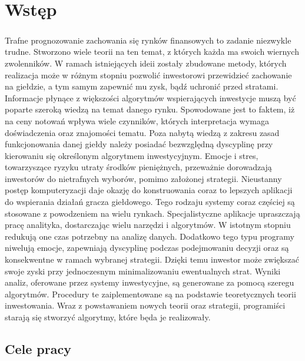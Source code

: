 \documentclass[pdflatex,11pt]{aghdpl}
\author{Tomasz Górny}
\date{2012}
\begin{document}
\titlepages

\tableofcontents
\clearpage

\chapter{Wstęp}
\label{chap:wstep}
\paragraph{}
Trafne prognozowanie zachowania się rynków finansowych to zadanie niezwykle trudne. Stworzono wiele teorii na ten temat, z których każda ma swoich wiernych zwolenników. W ramach istniejących ideii zostały zbudowane metody, których realizacja może w różnym stopniu pozwolić inwestorowi przewidzieć zachowanie na giełdzie, a tym samym zapewnić mu zysk, bądź uchronić przed stratami. Informacje płynące z większości algorytmów wspierających inwestycje muszą być poparte szeroką wiedzą na temat danego rynku. Spowodowane jest to faktem, iż na ceny notowań wpływa wiele czynników, których interpretacja wymaga doświadczenia oraz znajomości tematu. Poza nabytą wiedzą z zakresu zasad funkcjonowania danej giełdy należy posiadać bezwzględną dyscyplinę przy kierowaniu się określonym algorytmem inwestycyjnym. Emocje i stres, towarzyszące ryzyku utraty środków pieniężnych, przeważnie dorowadzają inwestorów do nietrafnych wyborów, pomimo założonej strategii. Nieustanny postęp komputeryzacji daje okazję do konstruowania coraz to lepszych aplikacji do wspierania działań gracza giełdowego. Tego rodzaju systemy coraz częściej są stosowane z powodzeniem na wielu rynkach. Specjalistyczne aplikacje upraszczają pracę analityka, dostarczając wielu narzędzi i algorytmów. W istotnym stopniu redukują one czas potrzebny na analizę danych. Dodatkowo tego typu programy niwelują emocje, zapewniają dyscyplinę podczas podejmowaniu decyzji oraz są konsekwentne w ramach wybranej strategii. Dzięki temu inwestor może zwiększać swoje zyski przy jednoczesnym minimalizowaniu ewentualnych strat. Wyniki analiz, oferowane przez systemy inwestycyjne, są generowane za pomocą szeregu algorytmów. Procedury te zaiplementowane są na podstawie teoretycznych teorii inwestowania. Wraz z powstawaniem nowych teorii oraz strategii, programiści starają się stworzyć algorytmy, które będa je realizowały.  
\section{Cele pracy}
\end{document}
